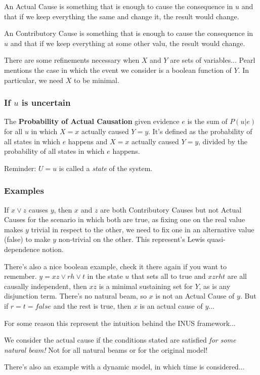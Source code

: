An Actual Cause is something that is enough to cause the consequence in $u$ and that if we keep everything the same and change it, the result would change.

An Contributory Cause is something that is enough to cause the consequence in $u$ and that if we keep everything at some other valu, the result would change.

There are some refinements necessary when $X$ and $Y$ are sets of variables... Pearl mentions the case in which the event we consider is a boolean function of $Y$. In particular, we need $X$ to be minimal.

\subsubsection{If $u$ is uncertain}

The \textbf{Probability of Actual Causation} given evidence $e$ is the sum of $P(u|e)$ for all $u$ in which $X=x$ actually caused $Y=y$. It's defined as the probability of all states in which $e$ happens and $X=x$ actually caused $Y=y$, divided by the probability of all states in which $e$ happens.

Reminder: $U=u$ is called a \textit{state} of the system.


\subsubsection{Examples}

If $x\lor z$ causes $y$, then $x$ and $z$ are both Contributory Causes but not Actual Causes for the scenario in which both are true, as fixing one on the real value makes $y$ trivial in respect to the other, we need to fix one in an alternative value (false) to make $y$ non-trivial on the other. This represent's Lewis quasi-dependence notion.

There's also a nice boolean example, check it there again if you want to remember. $y = xz \lor rh \lor t$ in the state $u$ that sets all to true and $xzrht$ are all causally independent, then $xz$ is a minimal sustaining set for $Y$, as is any disjunction term. There's no natural beam, so $x$ is not an Actual Cause of $y$. But if $r=t=false$ and the rest is true, then $x$ is an actual cause of $y$...

For some reason this represent the intuition behind the INUS framework...

We consider the actual cause if the conditions stated are satisfied \textit{for some natural beam!} Not for all natural beams or for the original model!

There's also an example with a dynamic model, in which time is considered...
